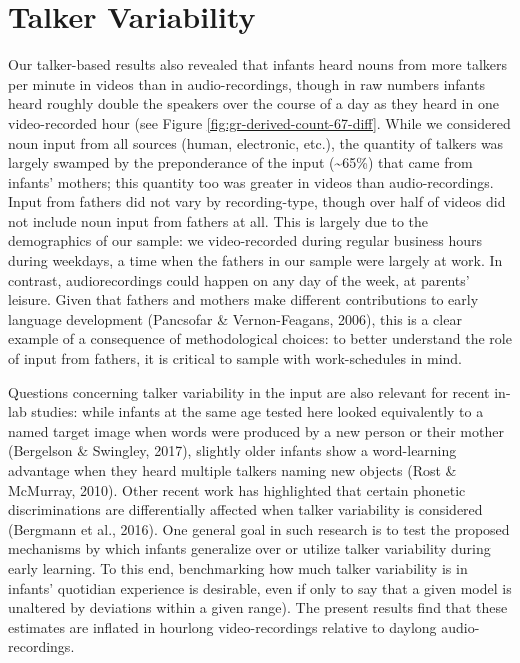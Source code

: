 \documentclass[floatsintext,man]{apa6}
\theoremstyle{definition}
\theoremstyle{definition}
\theoremstyle{definition}
\theoremstyle{remark}
\begin{document}
\section{Talker Variability}\label{talker-variability}

Our talker-based results also revealed that infants heard nouns from
more talkers per minute in videos than in audio-recordings, though in
raw numbers infants heard roughly double the speakers over the course of
a day as they heard in one video-recorded hour (see Figure
\ref{fig:gr-derived-count-67-diff}. While we considered noun input from
all sources (human, electronic, etc.), the quantity of talkers was
largely swamped by the preponderance of the input
(\textasciitilde{}65\%) that came from infants' mothers; this quantity
too was greater in videos than audio-recordings. Input from fathers did
not vary by recording-type, though over half of videos did not include
noun input from fathers at all. This is largely due to the demographics
of our sample: we video-recorded during regular business hours during
weekdays, a time when the fathers in our sample were largely at work. In
contrast, audiorecordings could happen on any day of the week, at
parents' leisure. Given that fathers and mothers make different
contributions to early language development (Pancsofar \&
Vernon-Feagans, 2006), this is a clear example of a consequence of
methodological choices: to better understand the role of input from
fathers, it is critical to sample with work-schedules in mind.

Questions concerning talker variability in the input are also relevant
for recent in-lab studies: while infants at the same age tested here
looked equivalently to a named target image when words were produced by
a new person or their mother (Bergelson \& Swingley, 2017), slightly
older infants show a word-learning advantage when they heard multiple
talkers naming new objects (Rost \& McMurray, 2010). Other recent work
has highlighted that certain phonetic discriminations are differentially
affected when talker variability is considered (Bergmann et al., 2016).
One general goal in such research is to test the proposed mechanisms by
which infants generalize over or utilize talker variability during early
learning. To this end, benchmarking how much talker variability is in
infants' quotidian experience is desirable, even if only to say that a
given model is unaltered by deviations within a given range). The
present results find that these estimates are inflated in hourlong
video-recordings relative to daylong audio-recordings.
\end{document}
